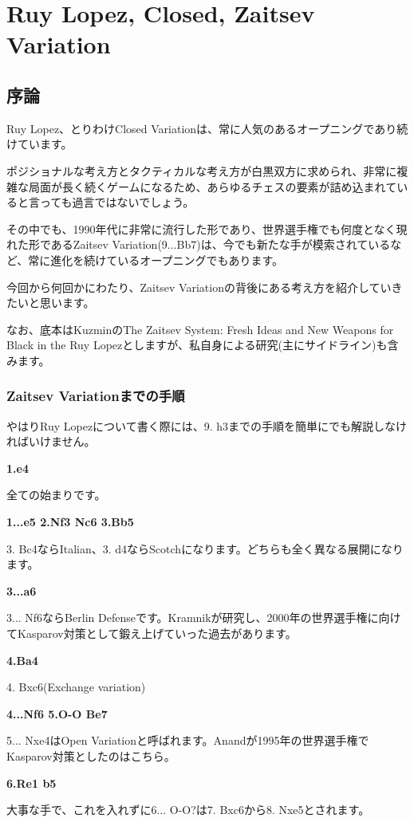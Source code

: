 \section{Ruy Lopez, Closed, Zaitsev Variation}
\subsection{序論}
Ruy Lopez、とりわけClosed Variationは、常に人気のあるオープニングであり続けています。

ポジショナルな考え方とタクティカルな考え方が白黒双方に求められ、非常に複雑な局面が長く続くゲームになるため、あらゆるチェスの要素が詰め込まれていると言っても過言ではないでしょう。

その中でも、1990年代に非常に流行した形であり、世界選手権でも何度となく現れた形であるZaitsev Variation(9...Bb7)は、今でも新たな手が模索されているなど、常に進化を続けているオープニングでもあります。

今回から何回かにわたり、Zaitsev Variationの背後にある考え方を紹介していきたいと思います。

なお、底本はKuzminのThe Zaitsev System: Fresh Ideas and New Weapons for Black in the Ruy Lopezとしますが、私自身による研究(主にサイドライン)も含みます。


\subsubsection{Zaitsev Variationまでの手順}

やはりRuy Lopezについて書く際には、9. h3までの手順を簡単にでも解説しなければいけません。

{\bf 1.e4}

全ての始まりです。 

{\bf 1...e5 2.Nf3 Nc6 3.Bb5}

3. Bc4ならItalian、3. d4ならScotchになります。どちらも全く異なる展開になります。

{\bf 3...a6}

3... Nf6ならBerlin Defenseです。Kramnikが研究し、2000年の世界選手権に向けてKasparov対策として鍛え上げていった過去があります。 

{\bf 4.Ba4}

4. Bxc6(Exchange variation) 

{\bf 4...Nf6 5.O-O Be7}

5... Nxe4はOpen Variationと呼ばれます。Anandが1995年の世界選手権でKasparov対策としたのはこちら。

{\bf 6.Re1 b5}

大事な手で、これを入れずに6... O-O?は7. Bxc6から8. Nxe5とされます。

